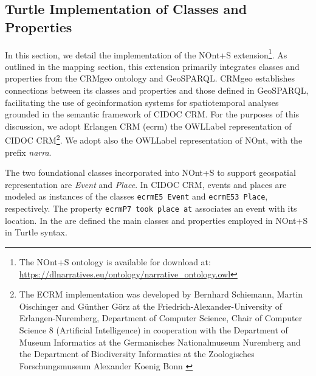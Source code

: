 \subsection{Turtle Implementation of Classes and Properties}\label{V-subsec:turtle-implementation}

In this section, we detail the implementation of the NOnt+S extension\footnote{The NOnt+S ontology is available for download at: \url{https://dlnarratives.eu/ontology/narrative_ontology.owl}}. As outlined in the mapping section, this extension primarily integrates classes and properties from the CRMgeo ontology and GeoSPARQL. CRMgeo establishes connections between its classes and properties and those defined in GeoSPARQL, facilitating the use of geoinformation systems for spatiotemporal analyses grounded in the semantic framework of CIDOC CRM. For the purposes of this discussion, we adopt Erlangen CRM (\gls{ecrm}) the \acrshort{OWLLabel} representation of CIDOC CRM\footnote{The ECRM implementation was developed by Bernhard Schiemann, Martin Oischinger and Günther Görz at the Friedrich-Alexander-University of Erlangen-Nuremberg, Department of Computer Science, Chair of Computer Science 8 (Artificial Intelligence) in cooperation with the Department of Museum Informatics at the Germanisches Nationalmuseum Nuremberg and the Department of Biodiversity Informatics at the Zoologisches Forschungsmuseum Alexander Koenig Bonn \cite{schiemannErlangenCRMOWL}}. We adopt also the \acrshort{OWLLabel} representation of NOnt, with the prefix \textit{narra}. 

The two foundational classes incorporated into NOnt+S to support geospatial representation are \textit{Event} and \textit{Place}. In CIDOC CRM, events and places are modeled as instances of the classes \texttt{\gls{ecrm}E5 Event} and \texttt{\gls{ecrm}E53 Place}, respectively. The property \texttt{\gls{ecrm}P7 took place at} associates an event with its location. 
In the  are defined the main classes and properties employed in NOnt+S in Turtle syntax.


